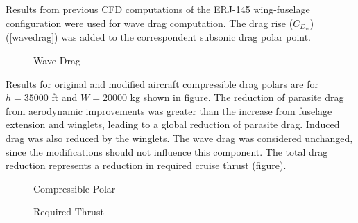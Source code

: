 ﻿ Results from previous CFD computations of the ERJ-145 wing-fuselage configuration were used for wave drag computation. The drag rise ($C_{D_{w}}$) (\ref{wavedrag}) was added to the correspondent subsonic drag polar point.


\begin{figure}[H] %
\caption{Wave Drag}
\label{fig:wavedrag}
\end{figure}

Results for original and modified aircraft compressible drag polars are for $h=35000$ ft and $W=20000$ kg shown in figure. The reduction of parasite drag from aerodynamic improvements was greater than the increase from fuselage extension and winglets, leading to a global reduction of parasite drag. Induced drag was also reduced by the winglets. The wave drag was considered unchanged, since the modifications should not influence this component. The total drag reduction represents a reduction in required cruise thrust (figure).

\begin{figure}[H] %
\caption{Compressible Polar}
\label{fig:compressiblepolar}
\end{figure}

\begin{figure}[H] %
\caption{Required Thrust}
\label{fig:requiredthrust}
\end{figure}
